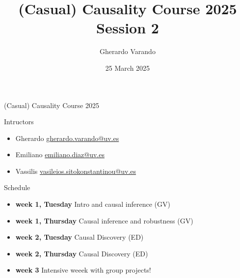 \documentclass{beamer}
\institute[]{}
\title{(Casual) Causality Course 2025 \\ Session 2}
\author{Gherardo Varando}
\date{25 March 2025}
\begin{document}
\begin{frame}
\maketitle
\end{frame}

\begin{frame}{(Casual) Causality Course 2025}

	\begin{block}{Intructors}
	  \begin{itemize}
	    \item Gherardo \url{gherardo.varando@uv.es}
	    \item Emiliano \url{emiliano.diaz@uv.es} 
	    \item Vassilis \url{vasileios.sitokonstantinou@uv.es}
	  \end{itemize}
	\end{block}
	
	\begin{block}{Schedule} 
         \begin{itemize}
	   \item \textbf{week 1, Tuesday} Intro and causal inference (GV)
	   \item \textbf{week 1, Thursday} Causal inference and robustness (GV)    
	   \item \textbf{week 2, Tuesday} Causal Discovery (ED)
	   \item \textbf{week 2, Thursday} Causal Discovery (ED)
	   \item \textbf{week 3} Intensive weeek with group projects! 
	 \end{itemize}
	\end{block}


\end{frame}
\end{document}
